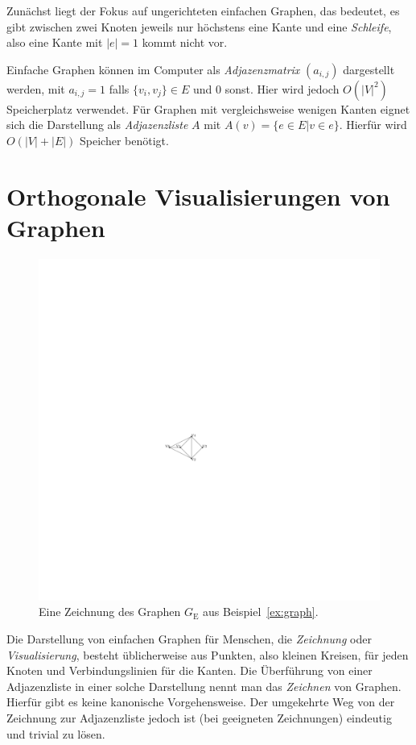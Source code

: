 \documentclass[a4paper]{scrreprt}
\theoremstyle{definition}
\begin{document}
Zunächst liegt der Fokus auf ungerichteten einfachen Graphen, das bedeutet, es gibt zwischen zwei Knoten jeweils nur höchstens eine Kante und eine \emph{Schleife}, also eine Kante mit $|e| = 1$ kommt nicht vor.

Einfache Graphen können im Computer als \emph{Adjazenzmatrix} $(a_{i,j})$ dargestellt werden, mit $a_{i,j} = 1$ falls $\{v_i, v_j\} \in E$ und $0$ sonst. Hier wird jedoch $O(|V|^2)$ Speicherplatz verwendet. Für Graphen mit vergleichsweise wenigen Kanten eignet sich die Darstellung als \emph{Adjazenzliste} $A$ mit $A(v) = \{e \in E | v \in e\}$. Hierfür wird $O(|V| + |E|)$ Speicher benötigt. %

\section{Orthogonale Visualisierungen von Graphen}

\begin{figure}[h]
  \centering
  \includegraphics{exampleA_straightline}
  \caption{Eine Zeichnung des Graphen $G_\text{E}$ aus Beispiel~\ref{ex:graph}.}
  \label{fig:exampleAstraightline}
\end{figure}

Die Darstellung von einfachen Graphen für Menschen, die \emph{Zeichnung} oder \emph{Visualisierung}, besteht üblicherweise aus Punkten, also kleinen Kreisen, für jeden Knoten und Verbindungslinien für die Kanten. Die Überführung von einer Adjazenzliste in einer solche Darstellung nennt man das \emph{Zeichnen} von Graphen. Hierfür gibt es keine kanonische Vorgehensweise. Der umgekehrte Weg von der Zeichnung zur Adjazenzliste jedoch ist (bei geeigneten Zeichnungen) eindeutig und trivial zu lösen.
\end{document}

